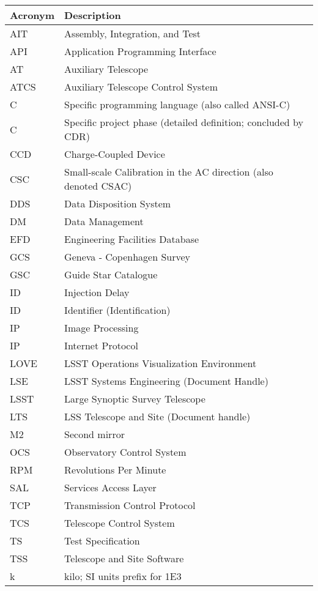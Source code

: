 \addtocounter{table}{-1}
\begin{longtable}{|l|p{}|}\hline
\textbf{Acronym} & \textbf{Description}  \\\hline

AIT & Assembly, Integration, and Test \\\hline
API & Application Programming Interface \\\hline
AT & Auxiliary Telescope \\\hline
ATCS & Auxiliary Telescope Control System \\\hline
C & Specific programming language (also called ANSI-C) \\\hline
C & Specific project phase (detailed definition; concluded by CDR) \\\hline
CCD & Charge-Coupled Device \\\hline
CSC & Small-scale Calibration in the AC direction (also denoted CSAC) \\\hline
DDS & Data Disposition System \\\hline
DM & Data Management \\\hline
EFD & Engineering Facilities Database \\\hline
GCS & Geneva - Copenhagen Survey \\\hline
GSC & Guide Star Catalogue \\\hline
ID & Injection Delay \\\hline
ID & Identifier (Identification) \\\hline
IP & Image Processing \\\hline
IP & Internet Protocol \\\hline
LOVE & LSST Operations Visualization Environment \\\hline
LSE & LSST Systems Engineering (Document Handle) \\\hline
LSST & Large Synoptic Survey Telescope \\\hline
LTS & LSS Telescope and Site (Document handle) \\\hline
M2 & Second mirror \\\hline
OCS & Observatory Control System \\\hline
RPM & Revolutions Per Minute \\\hline
SAL & Services Access Layer \\\hline
TCP & Transmission Control Protocol \\\hline
TCS & Telescope Control System \\\hline
TS & Test Specification \\\hline
TSS & Telescope and Site Software \\\hline
k & kilo; SI units prefix for 1E3 \\\hline
\end{longtable}
